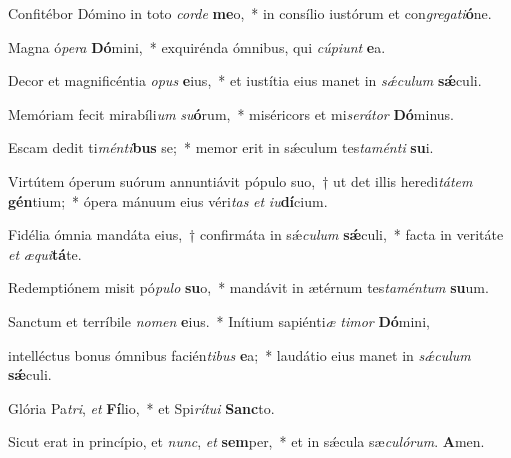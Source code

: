 \item Confitébor Dómino in toto \textit{cor}\textit{de} \textbf{me}o,~* in consílio iustórum et con\textit{gre}\textit{ga}\textit{ti}\textbf{ó}ne.

\item Magna ó\textit{pe}\textit{ra} \textbf{Dó}mini,~* exquirénda ómnibus, qui \textit{cú}\textit{pi}\textit{unt} \textbf{e}a.

\item Decor et magnificéntia \textit{o}\textit{pus} \textbf{e}ius,~* et iustítia eius manet in \textit{sǽ}\textit{cu}\textit{lum} \textbf{sǽ}culi.

\item Memóriam fecit mirabíli\textit{um} \textit{su}\textbf{ó}rum,~* miséricors et mi\textit{se}\textit{rá}\textit{tor} \textbf{Dó}minus.

\item Escam dedit ti\textit{mén}\textit{ti}\textbf{bus} se;~* memor erit in sǽculum tes\textit{ta}\textit{mén}\textit{ti} \textbf{su}i.

\item Virtútem óperum suórum annuntiávit pópulo suo,~† ut det illis heredi\textit{tá}\textit{tem} \textbf{gén}tium;~* ópera mánuum eius véri\textit{tas} \textit{et} \textit{iu}\textbf{dí}cium.

\item Fidélia ómnia mandáta eius,~† confirmáta in sǽ\textit{cu}\textit{lum} \textbf{sǽ}culi,~* facta in veritáte \textit{et} \textit{æ}\textit{qui}\textbf{tá}te.

\item Redemptiónem misit pó\textit{pu}\textit{lo} \textbf{su}o,~* mandávit in ætérnum tes\textit{ta}\textit{mén}\textit{tum} \textbf{su}um.

\item Sanctum et terríbile \textit{no}\textit{men} \textbf{e}ius.~* Inítium sapiénti\textit{æ} \textit{ti}\textit{mor} \textbf{Dó}mini,

\item intelléctus bonus ómnibus facién\textit{ti}\textit{bus} \textbf{e}a;~* laudátio eius manet in \textit{sǽ}\textit{cu}\textit{lum} \textbf{sǽ}culi.

\item Glória Pa\textit{tri}, \textit{et} \textbf{Fí}lio,~* et Spi\textit{rí}\textit{tu}\textit{i} \textbf{Sanc}to.

\item Sicut erat in princípio, et \textit{nunc}, \textit{et} \textbf{sem}per,~* et in sǽcula sæ\textit{cu}\textit{ló}\textit{rum}. \textbf{A}men.